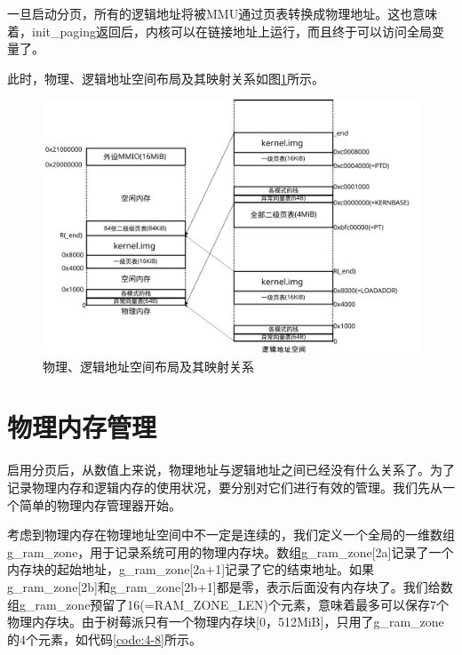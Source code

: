 \documentclass[main.tex]{subfiles}
\begin{document}
\begin{CJK*}{UTF8}{song}
\begin{code}
\label{code:4-7}
\inputminted[firstline=187,lastline=209,linenos,numbersep=5pt,frame=lines,framesep=2mm]{c}{src/chapter04/kernel/machdep.c}
\end{code}

\noindent
一旦启动分页，所有的逻辑地址将被MMU通过页表转换成物理地址。这也意味着，init\_paging返回后，内核可以在链接地址上运行，而且终于可以访问全局变量了。

\par
此时，物理、逻辑地址空间布局及其映射关系如图\ref{figure:4-7}所示。

\begin{figure}[htp]
\centering
\includegraphics[scale=0.3]{figures/4-7}
\caption{物理、逻辑地址空间布局及其映射关系}
\label{figure:4-7}
\end{figure}

\section{物理内存管理}
启用分页后，从数值上来说，物理地址与逻辑地址之间已经没有什么关系了。为了记录物理内存和逻辑内存的使用状况，要分别对它们进行有效的管理。我们先从一个简单的物理内存管理器开始。

\par
考虑到物理内存在物理地址空间中不一定是连续的，我们定义一个全局的一维数组g\_ram\_zone，用于记录系统可用的物理内存块。数组g\_ram\_zone[2a]记录了一个内存块的起始地址，g\_ram\_zone[2a+1]记录了它的结束地址。如果g\_ram\_zone[2b]和g\_ram\_zone[2b+1]都是零，表示后面没有内存块了。我们给数组g\_ram\_zone预留了16(=RAM\_ZONE\_LEN)个元素，意味着最多可以保存7个物理内存块。由于树莓派只有一个物理内存块[0，512MiB]，只用了g\_ram\_zone的4个元素，如代码\ref{code:4-8}所示。


\end{CJK*}
\end{document}
